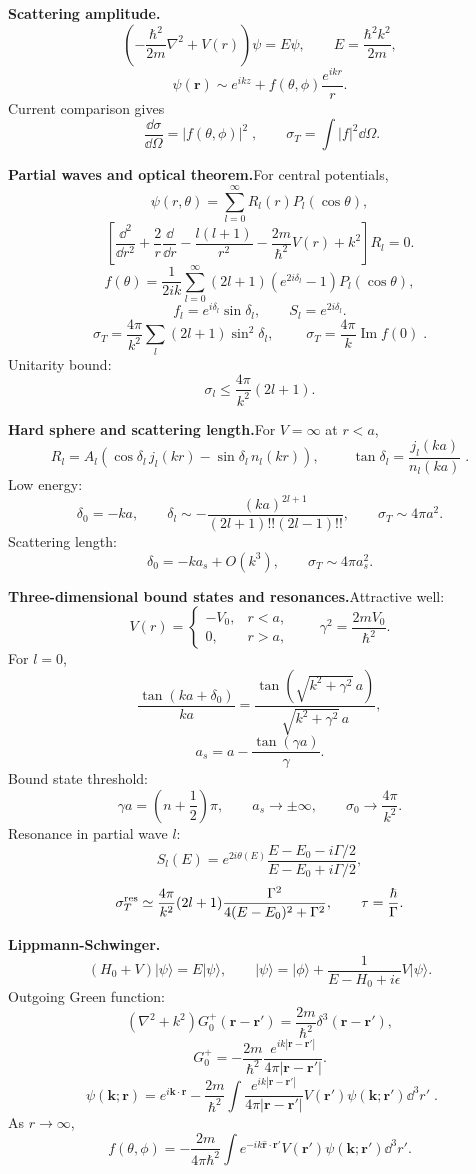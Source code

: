 \noindent\textbf{Scattering amplitude.}\quad
\[
\left(-\frac{\hbar^2}{2m}\nabla^2+V(r)\right)\psi
=E\psi,\qquad E=\frac{\hbar^2k^2}{2m},
\]
\[
\psi(\mathbf r)\sim e^{ikz}+f(\theta,\phi)\frac{e^{ikr}}{r}.
\]
Current comparison gives
\[
\boxed{\;\frac{\dd\sigma}{\dd\Omega}=|f(\theta,\phi)|^2\;},\qquad
\sigma_T=\int |f|^2\dd\Omega.
\]

\noindent\textbf{Partial waves and optical theorem.}\quad For central potentials,
\[
\psi(r,\theta)=\sum_{l=0}^\infty R_l(r)P_l(\cos\theta),
\]
\[
\left[\frac{\dd^2}{\dd r^2}+\frac2r\frac{\dd}{\dd r}
-\frac{l(l+1)}{r^2}-\frac{2m}{\hbar^2}V(r)+k^2\right]R_l=0.
\]
\[
f(\theta)=\frac1{2ik}\sum_{l=0}^\infty(2l+1)
(e^{2i\delta_l}-1)P_l(\cos\theta),
\]
\[
f_l=e^{i\delta_l}\sin\delta_l,\qquad
S_l=e^{2i\delta_l}.
\]
\[
\sigma_T=\frac{4\pi}{k^2}\sum_l(2l+1)\sin^2\delta_l,\qquad
\boxed{\;\sigma_T=\frac{4\pi}{k}\operatorname{Im}f(0)\;}.
\]
Unitarity bound:
\[
\sigma_l\le\frac{4\pi}{k^2}(2l+1).
\]

\noindent\textbf{Hard sphere and scattering length.}\quad For $V=\infty$ at $r<a$,
\[
R_l=A_l(\cos\delta_l\,j_l(kr)-\sin\delta_l\,n_l(kr)),\qquad
\boxed{\;\tan\delta_l=\frac{j_l(ka)}{n_l(ka)}\;}.
\]
Low energy:
\[
\delta_0=-ka,\qquad
\delta_l\sim-\frac{(ka)^{2l+1}}{(2l+1)!!(2l-1)!!},\qquad
\sigma_T\sim4\pi a^2.
\]
Scattering length:
\[
\delta_0=-ka_s+O(k^3),\qquad
\sigma_T\sim4\pi a_s^2.
\]

\noindent\textbf{Three-dimensional bound states and resonances.}\quad Attractive well:
\[
V(r)=\begin{cases}-V_0,&r<a,\\0,&r>a,\end{cases}\qquad
\gamma^2=\frac{2mV_0}{\hbar^2}.
\]
For $l=0$,
\[
\frac{\tan(ka+\delta_0)}{ka}
=\frac{\tan(\sqrt{k^2+\gamma^2}\,a)}
{\sqrt{k^2+\gamma^2}\,a},
\]
\[
a_s=a-\frac{\tan(\gamma a)}{\gamma}.
\]
Bound state threshold:
\[
\gamma a=\left(n+\frac12\right)\pi,\qquad
a_s\to\pm\infty,\qquad
\sigma_0\to\frac{4\pi}{k^2}.
\]
Resonance in partial wave $l$:
\[
S_l(E)=e^{2i\theta(E)}
\frac{E-E_0-i\Gamma/2}{E-E_0+i\Gamma/2},
\]
\[
\sigma_T^{\rm res}\simeq\frac{4\pi}{k^2}(2l+1)
\frac{\Gamma^2}{4(E-E_0)^2+\Gamma^2},\qquad
\tau=\frac{\hbar}{\Gamma}.
\]

\noindent\textbf{Lippmann-Schwinger.}\quad
\[
(H_0+V)|\psi\rangle=E|\psi\rangle,\qquad
|\psi\rangle=|\phi\rangle+\frac1{E-H_0+i\epsilon}V|\psi\rangle.
\]
Outgoing Green function:
\[
(\nabla^2+k^2)G_0^+(\mathbf r-\mathbf r')
=\frac{2m}{\hbar^2}\delta^3(\mathbf r-\mathbf r'),
\]
\[
G_0^+=-\frac{2m}{\hbar^2}\frac{e^{ik|\mathbf r-\mathbf r'|}}
{4\pi|\mathbf r-\mathbf r'|}.
\]
\[
\boxed{\;\psi(\mathbf k;\mathbf r)=e^{i\mathbf k\cdot\mathbf r}
-\frac{2m}{\hbar^2}\int
\frac{e^{ik|\mathbf r-\mathbf r'|}}{4\pi|\mathbf r-\mathbf r'|}
V(\mathbf r')\psi(\mathbf k;\mathbf r')\dd^3r'\;}.
\]
As $r\to\infty$,
\[
f(\theta,\phi)=-\frac{2m}{4\pi\hbar^2}
\int e^{-ik\hat{\mathbf r}\cdot\mathbf r'}
V(\mathbf r')\psi(\mathbf k;\mathbf r')\dd^3r'.
\]

